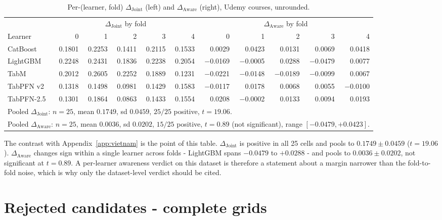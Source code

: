 \documentclass{article}
\newcommand{\djoint}{\Delta_{\text{Joint}}}
\newcommand{\daware}{\Delta_{\text{Aware}}}
\begin{document}
\begin{table}[H]
\centering\small
\caption{Per-(learner, fold) $\djoint$ (left) and $\daware$ (right), Udemy courses, unrounded.}
\begin{tabular}{lrrrrr@{\hskip 18pt}rrrrr}
\toprule
& \multicolumn{5}{c}{$\djoint$ by fold} & \multicolumn{5}{c}{$\daware$ by fold} \\
\cmidrule(r){2-6}\cmidrule(l){7-11}
Learner & 0 & 1 & 2 & 3 & 4 & 0 & 1 & 2 & 3 & 4 \\
\midrule
CatBoost   & 0.1801 & 0.2253 & 0.1411 & 0.2115 & 0.1533 & \phantom{-}0.0029 & \phantom{-}0.0423 & \phantom{-}0.0131 & \phantom{-}0.0069 & \phantom{-}0.0418 \\
LightGBM   & 0.2248 & 0.2431 & 0.1836 & 0.2238 & 0.2054 & $-$0.0169 & $-$0.0005 & 0.0288 & $-$0.0479 & 0.0077 \\
TabM       & 0.2012 & 0.2605 & 0.2252 & 0.1889 & 0.1231 & $-$0.0221 & $-$0.0148 & $-$0.0189 & $-$0.0099 & 0.0067 \\
TabPFN v2  & 0.1318 & 0.1498 & 0.0981 & 0.1429 & 0.1583 & $-$0.0117 & 0.0178 & 0.0068 & 0.0055 & $-$0.0100 \\
TabPFN-2.5 & 0.1301 & 0.1864 & 0.0863 & 0.1433 & 0.1554 & 0.0208 & $-$0.0002 & 0.0133 & 0.0094 & 0.0193 \\
\midrule
\multicolumn{11}{l}{Pooled $\djoint$: $n{=}25$, mean $0.1749$, sd $0.0459$, $25/25$ positive, $t = 19.06$.} \\
\multicolumn{11}{l}{Pooled $\daware$: $n{=}25$, mean $0.0036$, sd $0.0202$, $15/25$ positive, $t = 0.89$ (not significant), range $[-0.0479, +0.0423]$.} \\
\bottomrule
\end{tabular}
\end{table}

\noindent The contrast with Appendix~\ref{app:vietnam} is the point of this table. $\djoint$ is positive in
all 25 cells and pools to $0.1749 \pm 0.0459$ ($t = 19.06$). $\daware$ changes sign within a
single learner across folds - LightGBM spans $-0.0479$ to $+0.0288$ - and pools to
$0.0036 \pm 0.0202$, not significant at $t = 0.89$. A per-learner awareness verdict on this
dataset is therefore a statement about a margin narrower than the fold-to-fold noise, which is
why only the dataset-level verdict should be cited.

\section{Rejected candidates - complete grids}
\label{app:rejected}
\end{document}
